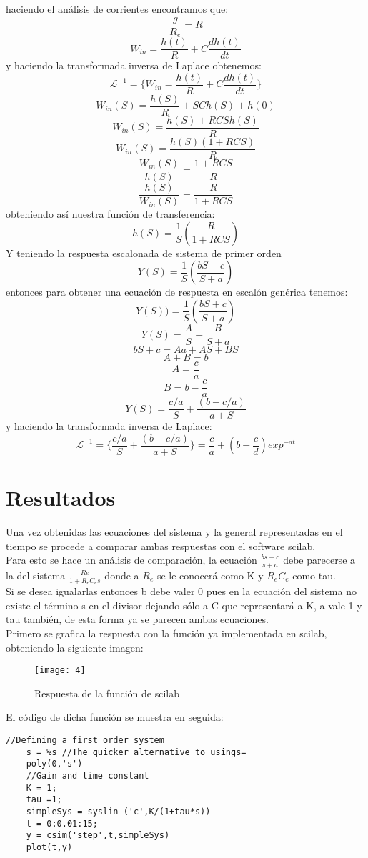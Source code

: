 \documentclass[12pt]{article}
\begin{document}
	haciendo el análisis de corrientes encontramos que:
	\[\frac{g}{R_e}=R\]
	\[W_{in}=\frac{h(t)}{R}+C\frac{dh(t)}{dt}\]
	y haciendo la transformada inversa de Laplace obtenemos:
	\[\mathcal{L}^{-1}=\{ W_{in}=\frac{h(t)}{R}+C\frac{dh(t)}{dt} \} \]
	\[W_{in}(S)=\frac{h(S)}{R}+SCh(S)+h(0)\]
	\[W_{in}(S)={\frac{h(S)+RCSh(S)}{R}}\]
	\[W_{in}(S)=\frac{h(S)(1+RCS)}{R}\]
	\[\frac{W_{in}(S)}{h(S)}=\frac{1+RCS}{R}\]
	\[\frac{h(S)}{W_{in}(S)}=\frac{R}{1+RCS}\]
	obteniendo así nuestra función de transferencia:
	\[h(S)=\frac{1}{S}(\frac{R}{1+RCS})\]
	Y teniendo la respuesta escalonada de sistema de primer orden
	\[Y(S)=\frac{1}{S}(\frac{bS+c}{S+a})\]
	entonces para obtener una ecuación de respuesta en escalón genérica tenemos:
	\[Y(S))=\frac{1}{S}(\frac{bS+c}{S+a})\]
	\[Y(S)=\frac{A}{S}+\frac{B}{S+a}\]
	\[bS+c=Aa+AS+BS\]
	\[A+B=b\]
	\[A=\frac{c}{a}\]
	\[B=b-\frac{c}{a}\]
	\[Y(S)=\frac{c/a}{S}+\frac{{(b-c/a)}}{a+S}\]
	y haciendo la transformada inversa de Laplace:
	\[\mathcal{L}^{-1}=\{\frac{c/a}{S}+\frac{{(b-c/a)}}{a+S}\}=\frac{c}{a}+(b-\frac{c}{d})exp^{-at}\]
	
	\section{Resultados}
	Una vez obtenidas las ecuaciones del sistema y la general representadas en el tiempo se procede a comparar ambas respuestas con el software scilab.\\
	Para esto se hace un análisis de comparación, la ecuación $\frac{bs+c}{s+a}$ debe parecerse a la del sistema $\frac{Re}{1+R_e C_e s}$ donde a $R_e$ se le conocerá como K y $R_e C_e$ como tau.\\ 
	Si se desea igualarlas entonces b debe valer 0 pues en la ecuación del sistema no existe el término s en el divisor dejando sólo a C que representará a K, a vale 1 y tau también, de esta forma ya se parecen ambas ecuaciones.\\
	Primero se grafica la respuesta con la función ya implementada en scilab, obteniendo la siguiente imagen: \\
	
	\begin{figure}[h]
		\centering
		\texttt{[image: 4]}
		\caption{Respuesta de la función de scilab}\label{figura 3}
	\end{figure}
	
	El código de dicha función se muestra en seguida:
	
	\begin{lstlisting}[frame=single]
	//Defining a first order system
	s = %s //The quicker alternative to usings=
	poly(0,'s')
	//Gain and time constant
	K = 1;
	tau =1;
	simpleSys = syslin ('c',K/(1+tau*s))
	t = 0:0.01:15;
	y = csim('step',t,simpleSys)
	plot(t,y)
	\end{lstlisting}
	
\end{document}
